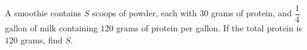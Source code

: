 A smoothie contains $S$ scoops of powder, each with $30$ grams of protein, and $\dfrac{1}{4}$ gallon of milk containing $120$ grams of protein per gallon. If the total protein is $120$ grams, find $S$.
